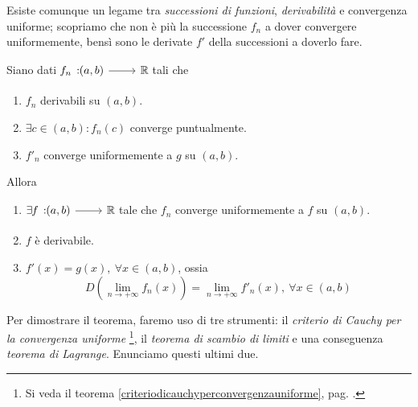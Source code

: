 Esiste comunque un legame tra \textit{successioni di funzioni}, \textit{derivabilità} e convergenza uniforme; scopriamo che non è più la successione $f_n$ a dover convergere uniformemente, bensì sono le derivate $f'$ della successioni a doverlo fare.
\begin{theorema}
	Siano dati $\funz{f_n}{\left(a,b\right)}{\realset}$ tali che
	\begin{enumerate}
		\item $f_n$ derivabili su $\left(a,b\right)$.
		\item $\exists c\in\left(a,b\right)\colon f_n\left(c\right)$ converge puntualmente.
		\item $f'_n$ converge uniformemente a $g$ su $\left(a,b\right)$.
	\end{enumerate}
Allora
\begin{enumerate}
	\item $\exists\funz{f}{\left(a,b\right)}{\realset}$ tale che $f_n$ converge uniformemente a $f$ su $\left(a,b\right)$.
	\item $f$ è derivabile.
	\item $f'(x)=g(x),\ \forall x\in \left(a,b\right)$, ossia
	\begin{equation}
		D\left(\lim_{n\to+\infty}f_n(x)\right)=\lim_{n\to+\infty}f'_n(x),\ \forall x\in\left(a,b\right)
	\end{equation}
\end{enumerate}
\end{theorema}
Per dimostrare il teorema, faremo uso di tre strumenti: il \textit{criterio di Cauchy per la convergenza uniforme} \footnote{Si veda il teorema \ref{criteriodicauchyperconvergenzauniforme}, pag. \pageref{criteriodicauchyperconvergenzauniforme}.}, il \textit{teorema di scambio di limiti} e una conseguenza \textit{teorema di Lagrange}. Enunciamo questi ultimi due.
